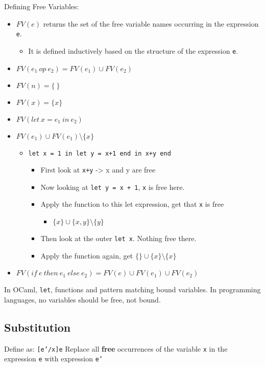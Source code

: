 \documentclass[11pt]{article}
\begin{document}
Defining Free Variables:
\begin{itemize}
\item \(FV(e)\) returns the set of the free variable names occurring in the expression \texttt{e}.
\begin{itemize}
\item It is defined inductively based on the structure of the expression \texttt{e}.
\end{itemize}
\item \(FV(e_1 \ op \ e_2) = FV(e_1) \cup FV(e_2)\)
\item \(FV(n) = \{ \ \}\)
\item \(FV(x) = \{x\}\)
\item \(FV(let \ x = e_1 \ in \ e_2)\)
\item \(FV(e_1) \cup FV(e_1) \setminus \{x\}\)
\begin{itemize}
\item \texttt{let x = 1 in let y = x+1 end in x+y end}
\begin{itemize}
\item First look at \texttt{x+y} -> x and y are free
\item Now looking at \texttt{let y = x + 1}, \texttt{x} is free here.
\item Apply the function to this let expression, get that \texttt{x} is free
\begin{itemize}
\item \(\{x\} \cup \{x,y\}\setminus \{y\}\)
\end{itemize}
\item Then look at the outer \texttt{let x}. Nothing free there.
\item Apply the function again, get \(\{\} \cup \{x\} \setminus \{x\}\)
\end{itemize}
\end{itemize}
\item \(FV(if \ e \ then \ e_1 \ else \ e_2) = FV(e) \cup FV(e_1) \cup FV(e_2)\)
\end{itemize}
In OCaml, \texttt{let}, functions and pattern matching bound variables. In programming languages, no variables should be free, not bound.
\subsection{Substitution}
\label{sec:org655a34b}
Define as: \texttt{[e'/x]e} Replace all \textbf{free} occurrences of the variable \texttt{x} in the expression \texttt{e} with expression \texttt{e'}
\end{document}

